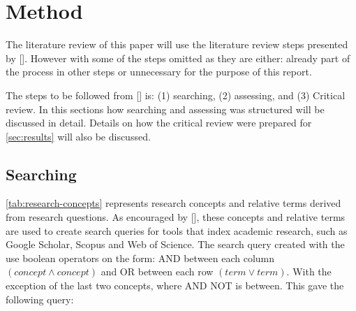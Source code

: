 \section{Method} \label{sec:method}
The literature review of this paper will use the literature review steps presented by [\cite{bjo_2012}]. However with some of the steps omitted as they are either: already part of the process in other steps or unnecessary for the purpose of this report.

The steps to be followed from [\cite{bjo_2012}] is: (1) searching, (2) assessing, and (3) Critical review. In this sections how searching and assessing was structured will be discussed in detail. Details on how the critical review were prepared for \autoref{sec:results} will also be discussed.





\subsection{Searching}
\autoref{tab:research-concepts} represents research concepts and relative terms derived from research questions. As encouraged by [\cite{bjo_2012}], these concepts and relative terms are used to create search queries for tools that index academic research, such as Google Scholar, Scopus and Web of Science. The search query created with the use boolean operators on the form: AND between each column $(concept \land concept)$ and OR between each row $(term \lor term)$. With the exception of the last two concepts, where AND NOT is between. This gave the following query:

